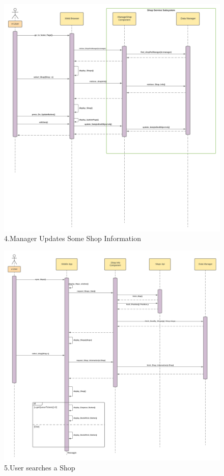 \begin{figure}[h!]
    \centering
    \includegraphics[width=1\textwidth]{Images/runtimeViewDD/updateshopruntime.png}
    \caption{\label{fig:RunTimeViewUpdateShopEnqueue}{4.Manager Updates Some Shop Information}}
\end{figure}

\begin{figure}[h!]
    \centering
    \includegraphics[width=1\textwidth]{Images/runtimeViewDD/RunTimeViewUserSearchAShop.png}
    \caption{\label{fig:RunTimeViewSearchesAShop}{5.User searches a Shop}}
\end{figure}






